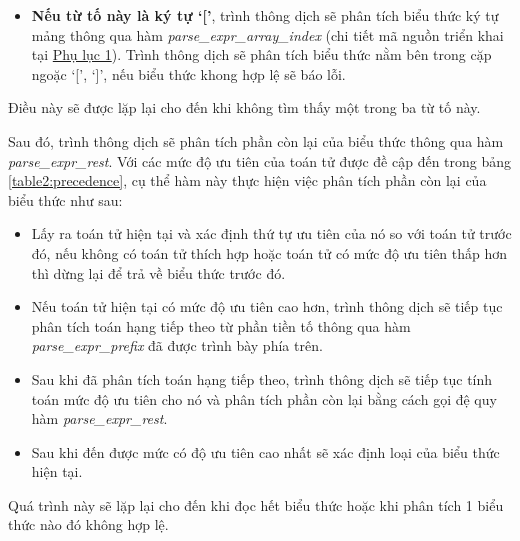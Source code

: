 \begin{itemize}
\begin{itemize}
        \item \textbf{Nếu từ tố này là ký tự `['}, trình thông dịch sẽ phân tích biểu thức ký tự mảng thông qua hàm \textit{parse\_expr\_array\_index} (chi tiết mã nguồn triển khai tại \hyperref[ap1:expr_array_index]{Phụ lục 1}). Trình thông dịch sẽ phân tích biểu thức nằm bên trong cặp ngoặc `[', `]', nếu biểu thức khong hợp lệ sẽ báo lỗi.
    \end{itemize}
    Điều này sẽ được lặp lại cho đến khi không tìm thấy một trong ba từ tố này.
\end{itemize}
Sau đó, trình thông dịch sẽ phân tích phần còn lại của biểu thức thông qua hàm \textit{parse\_expr\_rest}. Với các mức độ ưu tiên của toán tử được đề cập đến trong bảng \ref{table2:precedence}, cụ thể hàm này thực hiện việc phân tích phần còn lại của biểu thức như sau:
\begin{itemize}
    \item Lấy ra toán tử hiện tại và xác định thứ tự ưu tiên của nó so với toán tử trước đó, nếu không có toán tử thích hợp hoặc toán tử có mức độ ưu tiên thấp hơn thì dừng lại để trả về biểu thức trước đó.
    \item Nếu toán tử hiện tại có mức độ ưu tiên cao hơn, trình thông dịch sẽ tiếp tục phân tích toán hạng tiếp theo từ phần tiền tố thông qua hàm \textit{parse\_expr\_prefix} đã được trình bày phía trên.
    \item Sau khi đã phân tích toán hạng tiếp theo, trình thông dịch sẽ tiếp tục tính toán mức độ ưu tiên cho nó và phân tích phần còn lại bằng cách gọi đệ quy hàm \textit{parse\_expr\_rest}.
    \item Sau khi đến được mức có độ ưu tiên cao nhất sẽ xác định loại của biểu thức hiện tại.
\end{itemize}
Quá trình này sẽ lặp lại cho đến khi đọc hết biểu thức hoặc khi phân tích 1 biểu thức nào đó không hợp lệ.